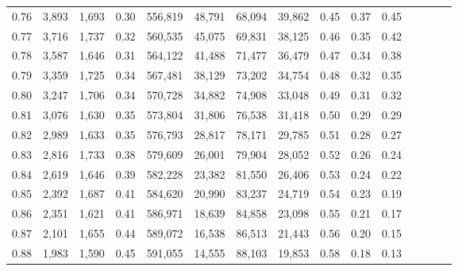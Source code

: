 \begin{tabular}{rrrcrrrrrrrrrrr}
0.76 &   3,893 &  1,693 &                                       0.30 &  556,819 &   48,791 &   68,094 &   39,862 &  0.45 &  0.37 &                         0.45 \\
0.77 &   3,716 &  1,737 &                                       0.32 &  560,535 &   45,075 &   69,831 &   38,125 &  0.46 &  0.35 &                         0.42 \\
0.78 &   3,587 &  1,646 &                                       0.31 &  564,122 &   41,488 &   71,477 &   36,479 &  0.47 &  0.34 &                         0.38 \\
0.79 &   3,359 &  1,725 &                                       0.34 &  567,481 &   38,129 &   73,202 &   34,754 &  0.48 &  0.32 &                         0.35 \\
0.80 &   3,247 &  1,706 &                                       0.34 &  570,728 &   34,882 &   74,908 &   33,048 &  0.49 &  0.31 &                         0.32 \\
0.81 &   3,076 &  1,630 &                                       0.35 &  573,804 &   31,806 &   76,538 &   31,418 &  0.50 &  0.29 &                         0.29 \\
0.82 &   2,989 &  1,633 &                                       0.35 &  576,793 &   28,817 &   78,171 &   29,785 &  0.51 &  0.28 &                         0.27 \\
0.83 &   2,816 &  1,733 &                                       0.38 &  579,609 &   26,001 &   79,904 &   28,052 &  0.52 &  0.26 &                         0.24 \\
0.84 &   2,619 &  1,646 &                                       0.39 &  582,228 &   23,382 &   81,550 &   26,406 &  0.53 &  0.24 &                         0.22 \\
0.85 &   2,392 &  1,687 &                                       0.41 &  584,620 &   20,990 &   83,237 &   24,719 &  0.54 &  0.23 &                         0.19 \\
0.86 &   2,351 &  1,621 &                                       0.41 &  586,971 &   18,639 &   84,858 &   23,098 &  0.55 &  0.21 &                         0.17 \\
0.87 &   2,101 &  1,655 &                                       0.44 &  589,072 &   16,538 &   86,513 &   21,443 &  0.56 &  0.20 &                         0.15 \\
0.88 &   1,983 &  1,590 &                                       0.45 &  591,055 &   14,555 &   88,103 &   19,853 &  0.58 &  0.18 &                         0.13 \\

\end{tabular}
